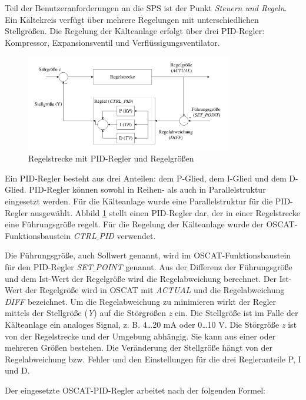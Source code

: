 Teil der Benutzeranforderungen an die SPS ist der Punkt \textit{Steuern und Regeln}. 
Ein Kältekreis verfügt über mehrere Regelungen mit unterschiedlichen Stellgrößen. Die Regelung der Kälteanlage erfolgt über drei PID-Regler: 	Kompressor,	Expansionsventil und Verflüssigungsventilator.

\begin{figure}[htb]
\centering		\includegraphics[page=1, width=0.80\textwidth]{Pictures/Versuchsaufbau/PID-Regler.pdf}
\caption{Regelstrecke mit PID-Regler und Regelgrößen}
\label{fig:PID_Regler}
\end{figure}

Ein PID-Regler besteht aus drei Anteilen: dem P-Glied, dem I-Glied und dem D-Glied. PID-Regler können sowohl in Reihen- als auch in Parallelstruktur eingesetzt werden. Für die Kälteanlage wurde eine Parallelstruktur für die PID-Regler ausgewählt. Abbild \ref{fig:PID_Regler} stellt einen  PID-Regler dar, der in einer Regelstrecke eine Führungsgröße regelt.
Für die Regelung der Kälteanlage wurde der OSCAT-Funktionsbaustein \textit{CTRL$\_$PID} verwendet. 

Die Führungsgröße, auch Sollwert genannt, wird im OSCAT-Funktionsbaustein für den PID-Regler \textit{SET$\_$POINT} genannt. Aus der Differenz der Führungsgröße und dem Ist-Wert der Regelgröße wird die Regelabweichung berechnet. Der Ist-Wert der Regelgröße wird in OSCAT mit \textit{ACTUAL} und die Regelabweichung \textit{DIFF} bezeichnet. 
Um die Regelabweichung zu minimieren wirkt der Regler mittels der Stellgröße (\textit{Y}) auf die Störgrößen \textit{z} ein. Die Stellgröße ist im Falle der Kälteanlage ein analoges Signal, z. B. 4\dots 20 mA oder 0\dots 10 V. Die Störgröße \textit{z} ist von der Regelstrecke und der Umgebung abhängig. Sie kann aus einer oder mehreren Größen bestehen. Die Veränderung der Stellgröße hängt von der Regelabweichung bzw. Fehler und den Einstellungen für die drei Regleranteile P, I und D. \citep{OSCAT2016}

Der eingesetzte OSCAT-PID-Regler arbeitet nach der folgenden Formel:

